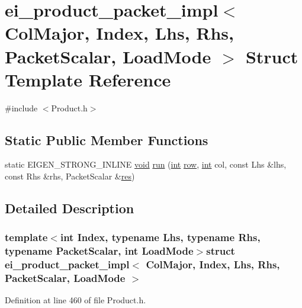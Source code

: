 \hypertarget{structei__product__packet__impl_3_01_col_major_00_01_index_00_01_lhs_00_01_rhs_00_01_packet_scalar_00_01_load_mode_01_4}{\section{ei\-\_\-product\-\_\-packet\-\_\-impl$<$ Col\-Major, Index, Lhs, Rhs, Packet\-Scalar, Load\-Mode $>$ Struct Template Reference}
\label{structei__product__packet__impl_3_01_col_major_00_01_index_00_01_lhs_00_01_rhs_00_01_packet_scalar_00_01_load_mode_01_4}
}


{\ttfamily \#include $<$Product.\-h$>$}

\subsection*{Static Public Member Functions}
\begin{DoxyCompactItemize}
\item 
static E\-I\-G\-E\-N\-\_\-\-S\-T\-R\-O\-N\-G\-\_\-\-I\-N\-L\-I\-N\-E \hyperlink{group___u_a_v_objects_plugin_ga444cf2ff3f0ecbe028adce838d373f5c}{void} \hyperlink{structei__product__packet__impl_3_01_col_major_00_01_index_00_01_lhs_00_01_rhs_00_01_packet_scalar_00_01_load_mode_01_4_a8f58d70a0829ac48e1e4141ba3dbcec3}{run} (\hyperlink{ioapi_8h_a787fa3cf048117ba7123753c1e74fcd6}{int} \hyperlink{glext_8h_a11b277b422822f784ee248b43eee3e1e}{row}, \hyperlink{ioapi_8h_a787fa3cf048117ba7123753c1e74fcd6}{int} col, const Lhs \&lhs, const Rhs \&rhs, Packet\-Scalar \&\hyperlink{glext_8h_a1dbb21208b9047cc8031ca9c840d3c2f}{res})
\end{DoxyCompactItemize}


\subsection{Detailed Description}
\subsubsection*{template$<$int Index, typename Lhs, typename Rhs, typename Packet\-Scalar, int Load\-Mode$>$struct ei\-\_\-product\-\_\-packet\-\_\-impl$<$ Col\-Major, Index, Lhs, Rhs, Packet\-Scalar, Load\-Mode $>$}



Definition at line 460 of file Product.\-h.



